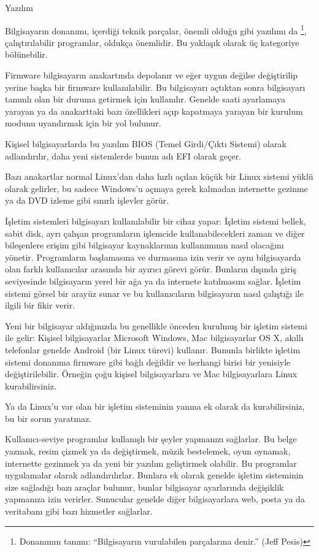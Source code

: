 \begin{section}{Yazılım}

Bilgisayarın donanımı, içerdiği teknik parçalar, önemli olduğu gibi yazılımı da
\footnote{Donanımın tanımı: “Bilgisayarın vurulabilen parçalarına denir.” (Jeff Pesis)}, çalıştırılabilir programlar, oldukça önemlidir. Bu yaklaşık olarak üç kategoriye bölünebilir.

Firmware bilgisayarın anakartında depolanır ve eğer uygun değilse değiştirilip yerine başka bir firmware kullanılabilir. Bu bilgisayarı açtıktan sonra bilgisayarı tanımlı olan bir duruma getirmek için kullanılır. Genelde saati ayarlamaya yarayan ya da anakarttaki bazı özellikleri açıp kapatmaya yarayan bir kurulum modunu uyandırmak için bir yol bulunur.

Kişisel bilgisayarlarda bu yazılım BIOS (Temel Girdi/Çıktı Sistemi) olarak adlandırılır, daha yeni sistemlerde bunun adı EFI olarak geçer.

Bazı anakartlar normal Linux'dan daha hızlı açılan küçük bir Linux sistemi yüklü olarak gelirler, bu sadece Windows'u açmaya gerek kalmadan internette gezinme ya da DVD izleme gibi sınırlı işlevler görür.

İşletim sistemleri bilgisayarı kullanılabilir bir cihaz yapar: İşletim sistemi bellek, sabit disk, ayrı çalışan programların işlemcide kullanabilecekleri zaman ve diğer bileşenlere erişim gibi bilgisayar kaynaklarının kullanımının nasıl olacağını yönetir. Programların başlamasına ve durmasına izin verir ve aynı bilgisayarda olan farklı kullanıcılar arasında bir ayırıcı görevi görür. Bunların dışında giriş seviyesinde bilgisayarın yerel bir ağa ya da internete katılmasını sağlar. İşletim sistemi görsel bir arayüz sunar ve bu kullanıcıların bilgisayarın nasıl çalıştığı ile ilgili bir fikir verir.

Yeni bir bilgisayar aldığınızda bu genellikle önceden kurulmuş bir işletim sistemi ile gelir: Kişisel bilgisayarlar Microsoft Windows, Mac bilgisayarlar OS X, akıllı telefonlar genelde Android (bir Linux türevi) kullanır. Bununla birlikte işletim sistemi donanıma firmware gibi bağlı değildir ve herhangi birisi bir yenisiyle değiştirilebilir. Örneğin çoğu kişisel bilgisayarlara ve Mac bilgisayarlara Linux kurabilirsiniz.

Ya da Linux'u var olan bir işletim sisteminin yanına ek olarak da kurabilirsiniz, bu bir sorun yaratmaz.

Kullanıcı-seviye programlar kullanışlı bir şeyler yapmanızı sağlarlar. Bu belge yazmak, resim çizmek ya da değiştirmek, müzik bestelemek, oyun oynamak, internette gezinmek ya da yeni bir yazılım geliştirmek olabilir. Bu programlar uygulamalar olarak adlandırılırlar. Bunlara ek olarak genelde işletim sisteminin size sağladığı bazı araçlar bulunur, bunlar bilgisayar ayarlarında değişiklik yapmanıza izin verirler. Sunucular genelde diğer bilgisayarlara web, posta ya da veritabanı gibi bazı hizmetler sağlarlar.
\end{section}

